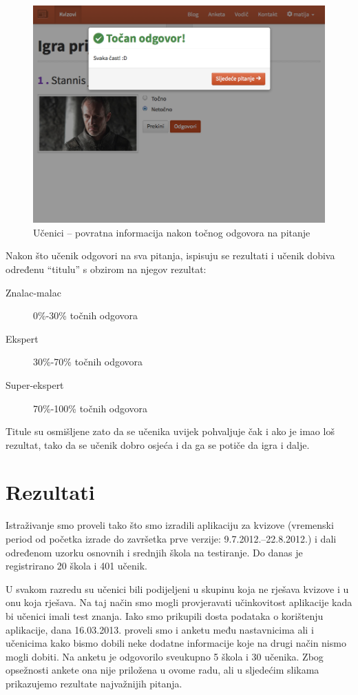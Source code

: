 \documentclass[11pt]{scrreprt}
\begin{document}
\begin{figure}[H]
  \includegraphics[width=\textwidth, clip=true, trim=0 7cm 0 0, fbox]{student/boolean_question_correct}
  \caption{Učenici -- povratna informacija nakon točnog odgovora na pitanje}
\end{figure}

Nakon što učenik odgovori na sva pitanja, ispisuju se rezultati i učenik dobiva
određenu ``titulu'' s obzirom na njegov rezultat:

\begin{description}
  \item[Znalac-malac] 0\%-30\% točnih odgovora
  \item[Ekspert] 30\%-70\% točnih odgovora
  \item[Super-ekspert] 70\%-100\% točnih odgovora
\end{description}

Titule su osmišljene zato da se učenika uvijek pohvaljuje čak i ako je imao loš
rezultat, tako da se učenik dobro osjeća i da ga se potiče da igra i dalje.

\chapter{Rezultati}
\label{chap:results}

Istraživanje smo proveli tako što smo izradili aplikaciju za kvizove (vremenski
period od početka izrade do završetka prve verzije: 9.7.2012.--22.8.2012.) i dali
određenom uzorku osnovnih i srednjih škola na testiranje. Do danas je
registrirano 20 škola i 401 učenik.

U svakom razredu su učenici bili podijeljeni u skupinu koja ne rješava kvizove
i u onu koja rješava. Na taj način smo mogli provjeravati učinkovitost
aplikacije kada bi učenici imali test znanja. Iako smo prikupili dosta podataka
o korištenju aplikacije, dana 16.03.2013. proveli smo i anketu među nastavnicima
ali i učenicima kako bismo dobili neke dodatne informacije koje na drugi način
nismo mogli dobiti. Na anketu je odgovorilo sveukupno 5 škola i 30 učenika.
Zbog opsežnosti ankete ona nije priložena u ovome radu, ali u sljedećim
slikama prikazujemo rezultate najvažnijih pitanja.
\end{document}
